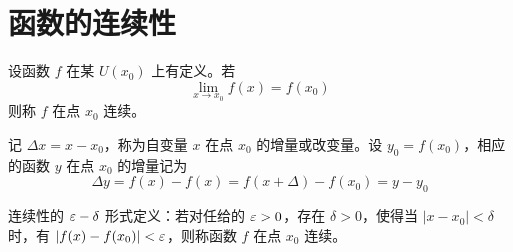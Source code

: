 
\section{函数的连续性}

\begin{definition}[连续性]
    设函数 $f$ 在某 $U(x_0)$ 上有定义。若
    $$\lim_{x\to x_0}f(x) = f(x_0)$$
    则称 $f$ 在点 $x_0$ 连续。
\end{definition}

记 $\Delta x = x-x_0$，称为自变量 $x$ 在点 $x_0$ 的增量或改变量。设 $y_0=f(x_0)$，相应的函数 $y$ 在点 $x_0$ 的增量记为
$$\Delta y = f(x)-f(x) = f(x+\Delta)-f(x_0) = y-y_0$$

连续性的 $\varepsilon-\delta$ 形式定义：若对任给的 $\varepsilon>0$，存在 $\delta>0$，使得当 $|x-x_0|<\delta$ 时，有 $|f(x)-f(x_0)|<\varepsilon$，则称函数 $f$ 在点 $x_0$ 连续。

